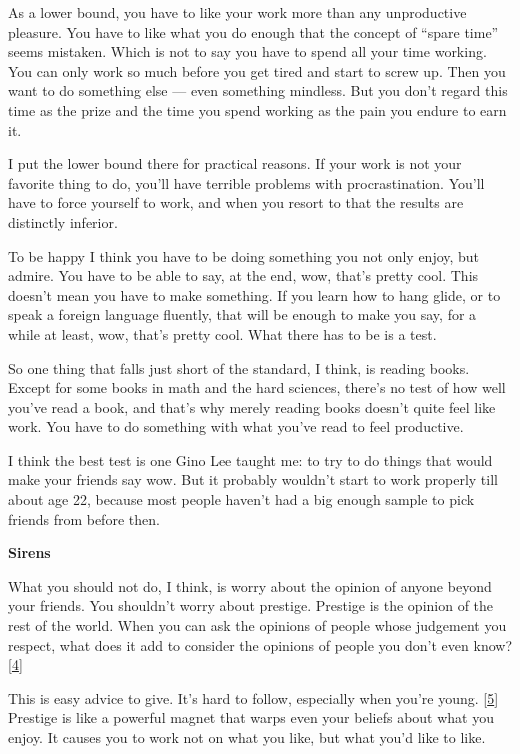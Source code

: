 As a lower bound, you have to like your work more than any unproductive
pleasure. You have to like what you do enough that the concept of
``spare time'' seems mistaken. Which is not to say you have to spend all
your time working. You can only work so much before you get tired and
start to screw up. Then you want to do something else --- even something
mindless. But you don't regard this time as the prize and the time you
spend working as the pain you endure to earn it.

I put the lower bound there for practical reasons. If your work is not
your favorite thing to do, you'll have terrible problems with
procrastination. You'll have to force yourself to work, and when you
resort to that the results are distinctly inferior.

To be happy I think you have to be doing something you not only enjoy,
but admire. You have to be able to say, at the end, wow, that's pretty
cool. This doesn't mean you have to make something. If you learn how to
hang glide, or to speak a foreign language fluently, that will be enough
to make you say, for a while at least, wow, that's pretty cool. What
there has to be is a test.

So one thing that falls just short of the standard, I think, is reading
books. Except for some books in math and the hard sciences, there's no
test of how well you've read a book, and that's why merely reading books
doesn't quite feel like work. You have to do something with what you've
read to feel productive.

I think the best test is one Gino Lee taught me: to try to do things
that would make your friends say wow. But it probably wouldn't start to
work properly till about age 22, because most people haven't had a big
enough sample to pick friends from before then.

\textbf{Sirens}

What you should not do, I think, is worry about the opinion of anyone
beyond your friends. You shouldn't worry about prestige. Prestige is the
opinion of the rest of the world. When you can ask the opinions of
people whose judgement you respect, what does it add to consider the
opinions of people you don't even know? {[}\hyperref[f4n]{4}{]}

This is easy advice to give. It's hard to follow, especially when you're
young. {[}\hyperref[f5n]{5}{]} Prestige is like a powerful magnet that
warps even your beliefs about what you enjoy. It causes you to work not
on what you like, but what you'd like to like.

